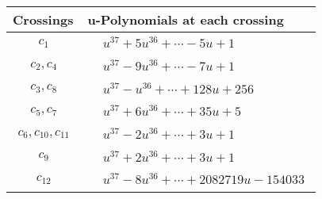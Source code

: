 \documentclass[1p]{elsarticle_modified}
\theoremstyle{definition}
\begin{document}
\begin{tabular}{m{50pt}|m{274pt}}
Crossings & \hspace{64pt}u-Polynomials at each crossing \\
\hline $$\begin{aligned}c_{1}\end{aligned}$$&$\begin{aligned}
&u^{37}+5 u^{36}+\cdots-5 u+1
\end{aligned}$\\
\hline $$\begin{aligned}c_{2},c_{4}\end{aligned}$$&$\begin{aligned}
&u^{37}-9 u^{36}+\cdots-7 u+1
\end{aligned}$\\
\hline $$\begin{aligned}c_{3},c_{8}\end{aligned}$$&$\begin{aligned}
&u^{37}- u^{36}+\cdots+128 u+256
\end{aligned}$\\
\hline $$\begin{aligned}c_{5},c_{7}\end{aligned}$$&$\begin{aligned}
&u^{37}+6 u^{36}+\cdots+35 u+5
\end{aligned}$\\
\hline $$\begin{aligned}c_{6},c_{10},c_{11}\end{aligned}$$&$\begin{aligned}
&u^{37}-2 u^{36}+\cdots+3 u+1
\end{aligned}$\\
\hline $$\begin{aligned}c_{9}\end{aligned}$$&$\begin{aligned}
&u^{37}+2 u^{36}+\cdots+3 u+1
\end{aligned}$\\
\hline $$\begin{aligned}c_{12}\end{aligned}$$&$\begin{aligned}
&u^{37}-8 u^{36}+\cdots+2082719 u-154033
\end{aligned}$\\
\hline
\end{tabular}\\~\\
\newpage\renewcommand{\arraystretch}{1}
\end{document}
